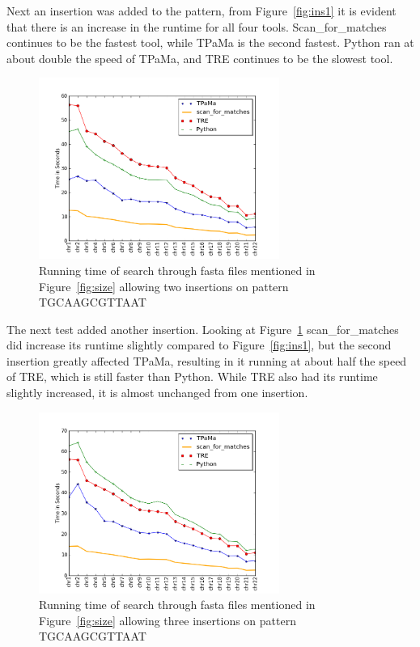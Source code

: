 Next an insertion was added to the pattern, from Figure~\ref{fig:ins1} it is evident that there is an increase in the runtime for all four tools. Scan\_for\_matches continues to be the fastest tool, while TPaMa is the second fastest. Python ran at about double the speed of TPaMa, and TRE continues to be the slowest tool.

\begin{figure}[h!]
\centering
\includegraphics[width=0.7\textwidth]{Benchmarking/2ins.png}
\caption{Running time of search through fasta files mentioned in Figure~\ref{fig:size} allowing two insertions on pattern TGCAAGCGTTAAT}
\label{fig:ins2}
\end{figure}

The next test added another insertion. Looking at Figure~\ref{fig:ins2} scan\_for\_matches did increase its runtime slightly compared to Figure~\ref{fig:ins1}, but the second insertion greatly affected TPaMa, resulting in it running at about half the speed of TRE, which is still faster than Python.  While TRE also had its runtime slightly increased, it is almost unchanged from one insertion.

\begin{figure}[h!]
\centering
\includegraphics[width=0.7\textwidth]{Benchmarking/3ins.png}
\caption{Running time of search through fasta files mentioned in Figure~\ref{fig:size} allowing three insertions on pattern TGCAAGCGTTAAT}
\label{fig:ins3}
\end{figure}

